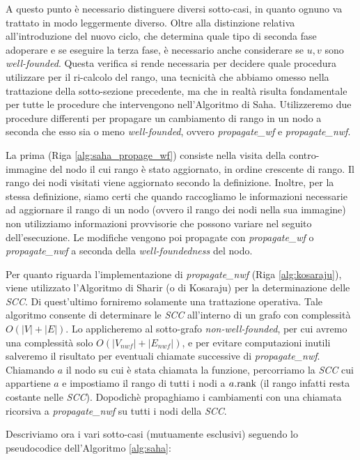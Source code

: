 A questo punto è necessario distinguere diversi sotto-casi, in quanto ognuno va trattato in modo leggermente diverso. Oltre alla distinzione relativa all'introduzione del nuovo ciclo, che determina quale tipo di seconda fase adoperare e se eseguire la terza fase, è necessario anche considerare se $u,v$ sono \emph{well-founded}. Questa verifica si rende necessaria per decidere quale procedura utilizzare per il ri-calcolo del rango, una tecnicità che abbiamo omesso nella trattazione della sotto-sezione precedente, ma che in realtà risulta fondamentale per tutte le procedure che intervengono nell'Algoritmo di Saha. Utilizzeremo due procedure differenti per propagare un cambiamento di rango in un nodo a seconda che esso sia o meno \emph{well-founded}, ovvero \emph{propagate\_wf} e \emph{propagate\_nwf}.

La prima (Riga \ref{alg:saha_propage_wf}) consiste nella visita della contro-immagine del nodo il cui rango è stato aggiornato, in ordine crescente di rango. Il rango dei nodi visitati viene aggiornato secondo la definizione. Inoltre, per la stessa definizione, siamo certi che quando raccogliamo le informazioni necessarie ad aggiornare il rango di un nodo (ovvero il rango dei nodi nella sua immagine) non utilizziamo informazioni provvisorie che possono variare nel seguito dell'esecuzione. Le modifiche vengono poi propagate con \emph{propagate\_wf} o \emph{propagate\_nwf} a seconda della \emph{well-foundedness} del nodo.

Per quanto riguarda l'implementazione di \emph{propagate\_nwf} (Riga \ref{alg:kosaraju}), viene utilizzato l'Algoritmo di Sharir (o di Kosaraju) \cite{sharir} per la determinazione delle \emph{SCC}. Di quest'ultimo forniremo solamente una trattazione operativa. Tale algoritmo consente di determinare le \emph{SCC} all'interno di un grafo con complessità $O(|V| + |E|)$. Lo applicheremo al sotto-grafo \emph{non-well-founded}, per cui avremo una complessità solo $O(|V_{nwf}| + |E_{nwf}|)$, e per evitare computazioni inutili salveremo il risultato per eventuali chiamate successive di \emph{propagate\_nwf}. Chiamando $a$ il nodo su cui è stata chiamata la funzione, percorriamo la \emph{SCC} cui appartiene $a$ e impostiamo il rango di tutti i nodi a $a.\textup{rank}$ (il rango infatti resta costante nelle \emph{SCC}). Dopodichè propaghiamo i cambiamenti con una chiamata ricorsiva a \emph{propagate\_nwf} su tutti i nodi della \emph{SCC}.

Descriviamo ora i vari sotto-casi (mutuamente esclusivi) seguendo lo pseudocodice dell'Algoritmo \ref{alg:saha}:


